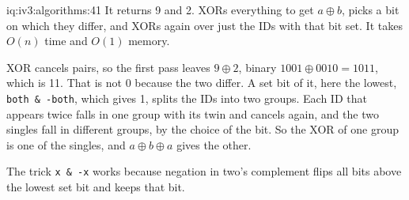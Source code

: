 \begin{solution}{iq:iv3:algorithms:41}
It returns 9 and 2.  XORs everything to get $a \oplus b$, picks a bit on which they differ, and XORs again over just the IDs with that bit set. It takes $O(n)$ time and $O(1)$ memory.
\label{lst:iv3:al:twosingles}

XOR cancels pairs, so the first pass leaves $9 \oplus 2$, binary $1001 \oplus 0010 = 1011$, which is 11. That is not 0 because the two differ. A set bit of it, here the lowest, \texttt{both \& -both}, which gives 1, splits the IDs into two groups. Each ID that appears twice falls in one group with its twin and cancels again, and the two singles fall in different groups, by the choice of the bit. So the XOR of one group is one of the singles, and $a \oplus b \oplus a$ gives the other.

The trick \texttt{x \& -x} works because negation in two's complement flips all bits above the lowest set bit and keeps that bit.

\end{solution}

